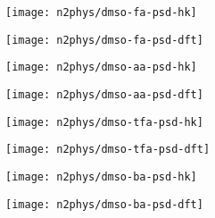 \begin{figure}[!h]
    \begin{subfigure}{0.25\linewidth}
        \texttt{[image: n2phys/dmso-fa-psd-hk]}%
        \label{appx:def:fgr:psd-dmso-fa-hk}
    \end{subfigure}%
    \begin{subfigure}{0.25\linewidth}
        \texttt{[image: n2phys/dmso-fa-psd-dft]}%
        \label{appx:def:fgr:psd-dmso-fa-dft}
    \end{subfigure}%
    \begin{subfigure}{0.25\linewidth}
        \texttt{[image: n2phys/dmso-aa-psd-hk]}%
        \label{appx:def:fgr:psd-dmso-aa-hk}
    \end{subfigure}%
    \begin{subfigure}{0.25\linewidth}
        \texttt{[image: n2phys/dmso-aa-psd-dft]}%
        \label{appx:def:fgr:psd-dmso-aa-dft}
    \end{subfigure}%

    \begin{subfigure}{0.25\linewidth}
        \texttt{[image: n2phys/dmso-tfa-psd-hk]}%
        \label{appx:def:fgr:psd-dmso-tfa-hk}
    \end{subfigure}%
    \begin{subfigure}{0.25\linewidth}
        \texttt{[image: n2phys/dmso-tfa-psd-dft]}%
        \label{appx:def:fgr:psd-dmso-tfa-dft}
    \end{subfigure}%
    \begin{subfigure}{0.25\linewidth}
        \texttt{[image: n2phys/dmso-ba-psd-hk]}%
        \label{appx:def:fgr:psd-dmso-ba-hk}
    \end{subfigure}%
    \begin{subfigure}{0.25\linewidth}
        \texttt{[image: n2phys/dmso-ba-psd-dft]}%
        \label{appx:def:fgr:psd-dmso-ba-dft}
    \end{subfigure}%

\end{figure}
